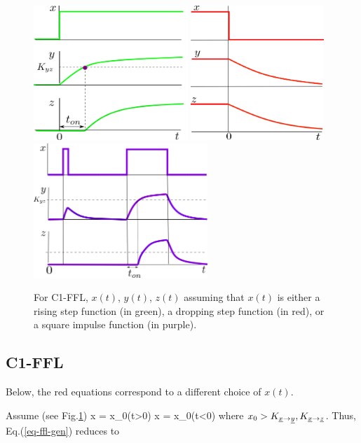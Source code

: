 \begin{figure}[h!]
\centering
\includegraphics[height=2in]
{autoregulons/c1-ffl-up-green.png}
\includegraphics[height=2in]
{autoregulons/c1-ffl-down-green.png}
\includegraphics[height=2in]
{autoregulons/c1-ffl-up-down-green.png}
\caption{For C1-FFL, $x(t)$, $y(t)$, $z(t)$ assuming 
that $x(t)$ is either a rising step function (in green),
a dropping step function (in red),
or a square impulse function (in purple).}
\label{fig-c1-ffl-triple}
\end{figure}



\subsection{C1-FFL}
Below, the red equations 
correspond to a different choice of $x(t)$.

Assume (see Fig.\ref{fig-c1-ffl-triple})
\beq
x = x_0\indi(t>0)
\eeq
\beq \nonumber
\color{red}
x = x_0\indi(t<0)
\eeq
where $x_0 > K_{\rvx\rarrow\rvy}, K_{\rvx\rarrow\rvz}$.
Thus, Eq.(\ref{eq-ffl-gen}) reduces to

